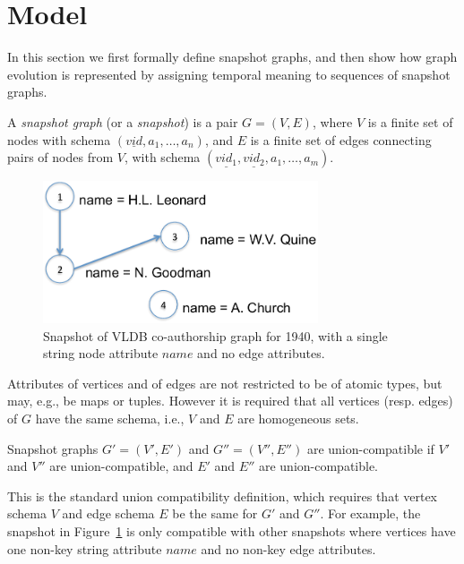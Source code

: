 \section{Model}
\label{sec:model}

In this section we first formally define snapshot graphs, and then
show how graph evolution is represented by assigning temporal meaning
to sequences of snapshot graphs.

\begin{definition}
\label{def:sg} 
A {\em snapshot graph} (or a {\em snapshot}) is a pair $G = (V,E)$,
where $V$ is a finite set of nodes with schema $(\underline{vid},
a_1, \ldots, a_n)$, and $E$ is a finite set of edges connecting
pairs of nodes from $V$, with schema $(\underline{vid_1},
\underline{vid_2}, a_1, \ldots, a_m)$.
\end{definition}

\begin{figure}
\includegraphics[width=3.2in]{figs/snapshot.pdf}
\caption{Snapshot of VLDB co-authorship graph for 1940, with a single string node attribute $name$ and no edge attributes.}
\label{fig:sg}
\end{figure}

Attributes of vertices and of edges are not restricted to be of atomic
types, but may, e.g., be maps or tuples. However it is required that
all vertices (resp. edges) of $G$ have the same schema, i.e., $V$ and
$E$ are homogeneous sets.

\begin{definition} 
\label{def:scompat}
Snapshot graphs $G' = (V', E')$ and $G'' = (V'', E'')$ are
union-compatible if $V'$ and $V''$ are union-compatible, and $E'$ and
$E''$ are union-compatible.
\end{definition}

This is the standard union compatibility definition, which requires
that vertex schema $V$ and edge schema $E$ be the same for $G'$ and
$G''$.  For example, the snapshot in Figure~\ref{fig:sg} is only
compatible with other snapshots where vertices have one non-key string
attribute $name$ and no non-key edge attributes.


